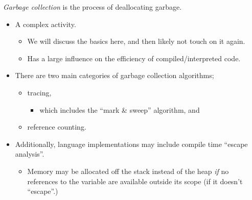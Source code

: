 \documentclass[11pt]{article}
\theoremstyle{definition}
\begin{document}
\emph{Garbage collection} is the process of deallocating garbage.
\begin{itemize}
\item A complex activity.
\begin{itemize}
\item We will discuss the basics here, and then likely not
touch on it again.
\item Has a large influence on the efficiency of
compiled/interpreted code.
\end{itemize}
\item There are two main categories of garbage collection algorithms;
\begin{itemize}
\item tracing,
\begin{itemize}
\item which includes the “mark \& sweep” algorithm, and
\end{itemize}
\item reference counting.
\end{itemize}
\item Additionally, language implementations may include compile time
“escape analysis”.
\begin{itemize}
\item Memory may be allocated off the stack instead of the heap
\emph{if} no references to the variable are available outside its scope
(if it doesn't “escape”.)
\end{itemize}
\end{itemize}
\end{document}
